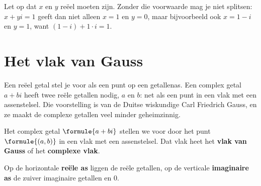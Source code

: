 Let op dat $x$ en $y$ reëel moeten zijn. Zonder die voorwaarde mag je niet splitsen: $x + yi = 1$ geeft dan niet alleen $x = 1$ en $y = 0$, maar bijvoorbeeld ook $x = 1 - i$ en $y = 1$, want $(1 - i) + 1 \cdot i = 1$.


\begin{oefeningen}
\end{oefeningen}

\section{Het vlak van Gauss}

Een reëel getal stel je voor als een punt op een getallenas. Een complex getal $a + bi$ heeft twee reële getallen nodig, $a$ en $b$: net als een punt in een vlak met een assenstelsel. Die voorstelling is van de Duitse wiskundige Carl Friedrich Gauss, en ze maakt de complexe getallen veel minder geheimzinnig.

\begin{theorie}
\begin{minipage}[t]{.55\linewidth}
\vspace{0pt}
Het complex getal $\formule{a + bi}$ stellen we voor door het punt $\formule{(a, b)}$ in een vlak met een assenstelsel. Dat vlak heet het \textbf{\textcolor{accent}{vlak van Gauss}} of het \textbf{\textcolor{accent}{complexe vlak}}.

\vspace{1mm}
Op de horizontale \textbf{\textcolor{accent}{reële as}} liggen de reële getallen, op de verticale \textbf{\textcolor{accent}{imaginaire as}} de zuiver imaginaire getallen en 0.
\end{minipage}\hfill
\begin{minipage}[t]{.4\linewidth}
\vspace{0pt}
\end{minipage}
\end{theorie}

